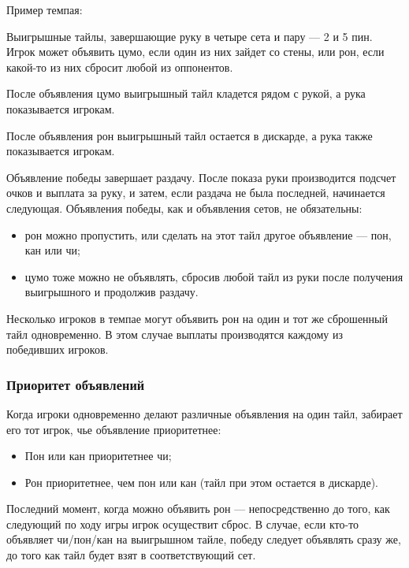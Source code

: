 \begin{example}

Пример темпая:
\vspace{5mm}

 \hfill {}
\vspace{5mm}

Выигрышные тайлы, завершающие руку в четыре сета и пару --- 2 и 5 пин. Игрок может объявить цумо, если один из них зайдет со стены, или рон, если какой-то из них сбросит любой из оппонентов.

\end{example}

После объявления цумо выигрышный тайл кладется рядом с рукой, а рука показывается игрокам.

После объявления рон выигрышный тайл остается в дискарде, а рука также показывается игрокам.

Объявление победы завершает раздачу. После показа руки производится подсчет очков и выплата за руку, и затем, если раздача не была последней, начинается следующая. Объявления победы, как и объявления сетов, не обязательны:

\begin{itemize}
	\item рон можно пропустить, или сделать на этот тайл другое объявление --- пон, кан или чи;
	\item цумо тоже можно не объявлять, сбросив любой тайл из руки после получения выигрышного и продолжив раздачу.
\end{itemize}

Несколько игроков в темпае могут объявить рон на один и тот же сброшенный тайл одновременно. В этом случае выплаты производятся каждому из победивших игроков.

\subsubsection{Приоритет объявлений}

Когда игроки одновременно делают различные объявления на один тайл, забирает его тот игрок, чье объявление приоритетнее:

\begin{itemize}
	\item Пон или кан приоритетнее чи;
	\item Рон приоритетнее, чем пон или кан (тайл при этом остается в дискарде).
\end{itemize}

Последний момент, когда можно объявить рон --- непосредственно до того, как следующий по ходу игры игрок осуществит сброс. В случае, если кто-то объявляет чи/пон/кан на выигрышном тайле, победу следует объявлять сразу же, до того как тайл будет взят в соответствующий сет.

